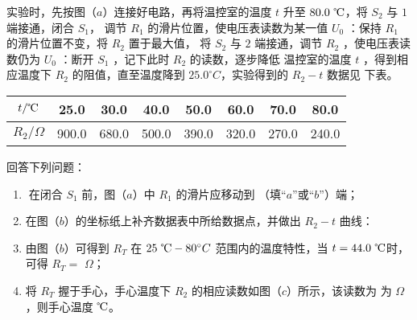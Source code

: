 \begin{enumerate}
实验时，先按图（$ a $）连接好电路，再将温控室的温度 $ t $ 升至 $ 80.0 \ \celsius $，将 $ S_{2} $ 与 $ 1 $ 端接通，闭合 $ S_{1} $，
调节 $ R_{1} $ 的滑片位置，使电压表读数为某一值 $ U_{0} $ ：保持 $ R_{1} $ 的滑片位置不变，将 $ R_{2} $ 置于最大值，
将 $ S_{2} $ 与 $ 2 $ 端接通，调节 $ R_{2} $ ，使电压表读数仍为 $ U_{0} $ ：断开 $ S_{1} $ ，记下此时 $ R_{2} $ 的读数，逐步降低
温控室的温度 $ t $ ，得到相应温度下 $ R_{2} $ 的阻值，直至温度降到 $ 25.0 ^{ \circ } C $，实验得到的 $ R_{2} -t $ 数据见
下表。

\begin{table}[h!]
\centering 
\begin{tabular}{|c|c|c|c|c|c|c|c|}
\hline 
$ t/ \celsius $ & 25.0 & 30.0 & 40.0 & 50.0 & 60.0 & 70.0 & 80.0
\\
\hline
$ R_2/ \Omega $ & 900.0 & 680.0 & 500.0 & 390.0 & 320.0 & 270.0 & 240.0\\ 
\hline 
\end{tabular}
\end{table} 


回答下列问题：
\begin{enumerate}
\renewcommand{\labelenumi}{\arabic{enumi}.}
\item
在闭合 $ S_{1} $ 前，图（$ a $）中 $ R_{1} $ 的滑片应移动到
（填“$ a $”或“$ b $”）端；




\item 
在图（$ b $）的坐标纸上补齐数据表中所给数据点，并做出 $ R_{2} -t $ 曲线：
\begin{figure}[h!]
\centering

\end{figure}



\item 
由图（$ b $）可得到 $ R_T $ 在 $ 25 \ \celsius -80 ^{ \circ } C $ 范围内的温度特性，当 $ t=44.0 \ \celsius $时，
可得 $ R_T= $
$ \Omega $；




\item 
将 $ R_T $ 握于手心，手心温度下 $ R_{2} $ 的相应读数如图（$ c $）所示，该读数为
为
$ \Omega $，则手心温度
$ \celsius $。





\end{enumerate}
\end{enumerate}
